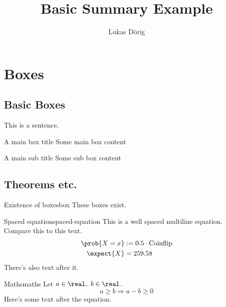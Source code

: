 \def\lutilpath{../..}



\title{Basic Summary Example}
\author{Lukas Dörig}



\maketitle

\section{Boxes}

\subsection{Basic Boxes}

This is a sentence.

\begin{mainbox}{A main box title}
  Some main box content
\end{mainbox}

\begin{subbox}{A main sub title}
  Some sub box content
\end{subbox}

\subsection{Theorems etc.}

\begin{axiom}{Existence of boxes}{box}
  These boxes exist.
\end{axiom}

\begin{definition}{Spaced equation}{spaced-equation}
  This is a well spaced multiline equation. Compare this to this text.
  \begin{align*}
    \prob{X = x} & := 0.5 \cdot \text{Coinflip} \\
    \expect{X}   & = 259.58
  \end{align*}
  There's also text after it.
\end{definition}

\begin{corollary}{Maths}{maths}
  Let $a \in \real,\ b \in \real$.
  \[
    a \geq b \Rightarrow a - b \geq 0
  \]
  Here's some text after the equation.
\end{corollary}

